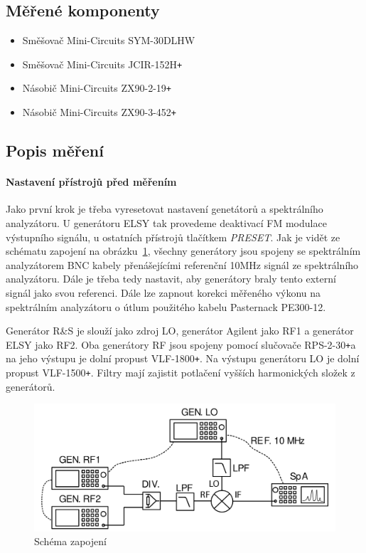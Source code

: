 \documentclass[11pt,a4paper]{article}
\newcommand{\plus}{{\texttt{+}}}
\begin{document}
\subsection*{Měřené komponenty}
\begin{itemize}
    \item Směšovač Mini-Circuits SYM-30DLHW
    \item Směšovač Mini-Circuits JCIR-152H\plus
    \item Násobič Mini-Circuits ZX90-2-19\plus
    \item Násobič Mini-Circuits ZX90-3-452\plus
\end{itemize}

\subsection*{Popis měření}
\paragraph*{Nastavení přístrojů před měřením} Jako první krok je třeba vyresetovat nastavení genetátorů a spektrálního analyzátoru. U generátoru ELSY tak provedeme deaktivací FM modulace výstupního signálu, u ostatních přístrojů tlačítkem \emph{PRESET}. Jak je vidět ze schématu zapojení na obrázku~\ref{fig:task0-zapojeni}, všechny generátory jsou spojeny se spektrálním analyzátorem BNC kabely přenášejícími referenční 10MHz signál ze spektrálního analyzátoru. Dále je třeba tedy nastavit, aby generátory braly tento externí signál jako svou referenci. Dále lze zapnout korekci měřeného výkonu na spektrálním analyzátoru o útlum použitého kabelu Pasternack PE300-12.

Generátor R\&S je slouží jako zdroj LO, generátor Agilent jako RF1 a generátor ELSY jako RF2. Oba generátory RF jsou spojeny pomocí slučovače RPS-2-30\plus a na jeho výstupu je dolní propust VLF-1800\plus. Na výstupu generátoru LO je dolní propust VLF-1500\plus. Filtry mají zajistit potlačení vyšších harmonických složek z generátorů.
\begin{figure}[!ht]
    \centering
    \includegraphics[width=.65\textwidth]{src/task0-zapojeni.png}
    \caption{Schéma zapojení}
    \label{fig:task0-zapojeni}
\end{figure}
\end{document}
